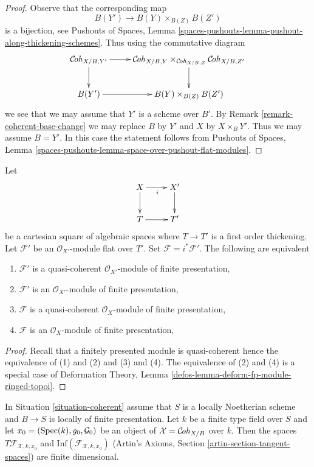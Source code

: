 \begin{proof}
Observe that the corresponding map
$$
B(Y') \longrightarrow B(Y) \times_{B(Z)} B(Z')
$$
is a bijection, see Pushouts of Spaces, Lemma
\ref{spaces-pushouts-lemma-pushout-along-thickening-schemes}.
Thus using the commutative diagram
$$
\xymatrix{
\Cohstack_{X/B, Y'} \ar[r] \ar[d] &
\Cohstack_{X/B, Y} \times_{\Cohstack_{X/B, Z}} \Cohstack_{X/B, Z'}
\ar[d] \\
B(Y') \ar[r] & B(Y) \times_{B(Z)} B(Z')
}
$$
we see that we may assume that $Y'$ is a scheme over $B'$. By
Remark \ref{remark-coherent-base-change}
we may replace $B$ by $Y'$ and $X$ by $X \times_B Y'$.
Thus we may assume $B = Y'$. In this case the statement follows from
Pushouts of Spaces, Lemma
\ref{spaces-pushouts-lemma-space-over-pushout-flat-modules}.
\end{proof}

\begin{lemma}
\label{lemma-coherent-over-first-order-thickening}
Let
$$
\xymatrix{
X \ar[d] \ar[r]_i & X' \ar[d] \\
T \ar[r] & T'
}
$$
be a cartesian square of algebraic spaces where $T \to T'$ is a first
order thickening. Let $\mathcal{F}'$ be an $\mathcal{O}_{X'}$-module
flat over $T'$. Set $\mathcal{F} = i^*\mathcal{F}'$. The following
are equivalent
\begin{enumerate}
\item $\mathcal{F}'$ is a quasi-coherent $\mathcal{O}_{X'}$-module
of finite presentation,
\item $\mathcal{F}'$ is an $\mathcal{O}_{X'}$-module of finite presentation,
\item $\mathcal{F}$ is a quasi-coherent $\mathcal{O}_X$-module
of finite presentation,
\item $\mathcal{F}$ is an $\mathcal{O}_X$-module of finite presentation,
\end{enumerate}
\end{lemma}

\begin{proof}
Recall that a finitely presented module is quasi-coherent hence the
equivalence of (1) and (2) and (3) and (4). The equivalence of (2)
and (4) is a special case of Deformation Theory, Lemma
\ref{defos-lemma-deform-fp-module-ringed-topoi}.
\end{proof}

\begin{lemma}
\label{lemma-coherent-tangent-space}
In Situation \ref{situation-coherent} assume that $S$ is a locally Noetherian
scheme and $B \to S$ is locally of finite presentation.
Let $k$ be a finite type field over $S$ and let
$x_0 = (\mathop{\mathrm{Spec}}(k), g_0, \mathcal{G}_0)$
be an object of $\mathcal{X} = \mathcal{C}\!\mathit{oh}_{X/B}$ over $k$. Then
the spaces $T\mathcal{F}_{\mathcal{X}, k, x_0}$ and
$\text{Inf}(\mathcal{F}_{\mathcal{X}, k, x_0})$
(Artin's Axioms, Section \ref{artin-section-tangent-spaces})
are finite dimensional.
\end{lemma}


